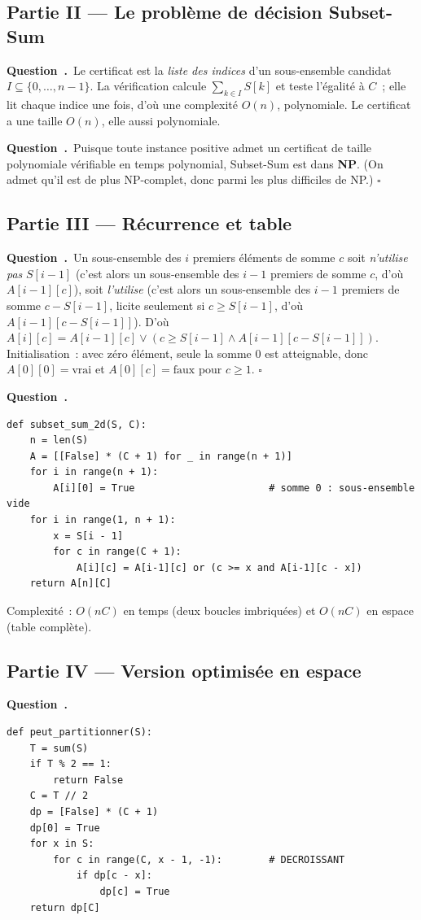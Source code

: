 \documentclass[11pt,a4paper]{article}
\newcounter{qcnt}
\newcommand{\Q}{\medskip\par\stepcounter{qcnt}\noindent\textbf{Question~\theqcnt.}~}
\begin{document}
\subsection*{Partie II --- Le problème de décision Subset-Sum}

\Q Le certificat est la \emph{liste des indices} d'un sous-ensemble candidat $I \subseteq
\{0,\dots,n-1\}$. La vérification calcule $\sum_{k\in I} S[k]$ et teste l'égalité à $C$~; elle
lit chaque indice une fois, d'où une complexité $O(n)$, polynomiale. Le certificat a une taille
$O(n)$, elle aussi polynomiale.

\Q Puisque toute instance positive admet un certificat de taille polynomiale vérifiable en temps
polynomial, Subset-Sum est dans \textbf{NP}. (On admet qu'il est de plus NP-complet, donc parmi
les plus difficiles de NP.) $\square$

\subsection*{Partie III --- Récurrence et table}

\Q Un sous-ensemble des $i$ premiers éléments de somme $c$ soit \emph{n'utilise pas} $S[i-1]$
(c'est alors un sous-ensemble des $i-1$ premiers de somme $c$, d'où $A[i-1][c]$), soit
\emph{l'utilise} (c'est alors un sous-ensemble des $i-1$ premiers de somme $c-S[i-1]$, licite
seulement si $c \ge S[i-1]$, d'où $A[i-1][c-S[i-1]]$). D'où
$A[i][c] = A[i-1][c] \lor (c \ge S[i-1] \land A[i-1][c-S[i-1]])$. Initialisation~: avec zéro
élément, seule la somme $0$ est atteignable, donc $A[0][0]=\text{vrai}$ et $A[0][c]=\text{faux}$
pour $c\ge 1$. $\square$

\Q
\begin{lstlisting}
def subset_sum_2d(S, C):
    n = len(S)
    A = [[False] * (C + 1) for _ in range(n + 1)]
    for i in range(n + 1):
        A[i][0] = True                       # somme 0 : sous-ensemble vide
    for i in range(1, n + 1):
        x = S[i - 1]
        for c in range(C + 1):
            A[i][c] = A[i-1][c] or (c >= x and A[i-1][c - x])
    return A[n][C]
\end{lstlisting}
Complexité~: $O(nC)$ en temps (deux boucles imbriquées) et $O(nC)$ en espace (table complète).

\subsection*{Partie IV --- Version optimisée en espace}

\Q
\begin{lstlisting}
def peut_partitionner(S):
    T = sum(S)
    if T % 2 == 1:
        return False
    C = T // 2
    dp = [False] * (C + 1)
    dp[0] = True
    for x in S:
        for c in range(C, x - 1, -1):        # DECROISSANT
            if dp[c - x]:
                dp[c] = True
    return dp[C]
\end{lstlisting}
\end{document}
